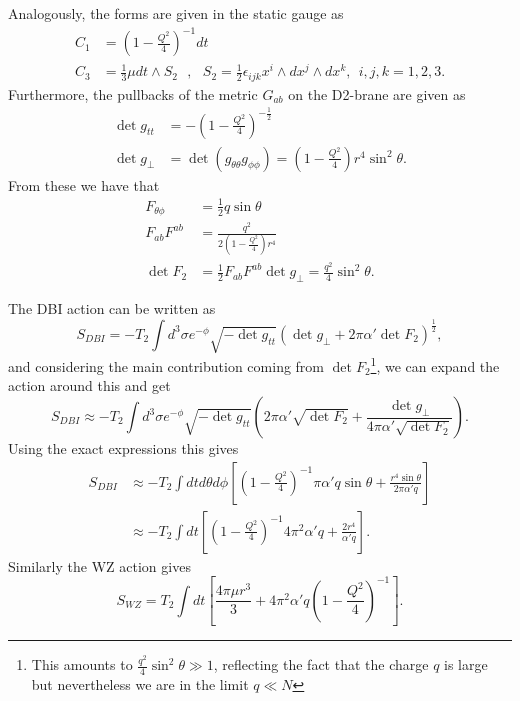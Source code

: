 \documentclass[11pt,english]{article}
\newcommand{\be}{\begin{equation}}
\newcommand{\ee}{\end{equation}}
\def\nn{\nonumber}
\numberwithin{equation}{section}
\begin{document}
\noindent
Analogously, the forms are given in the static gauge as 
\begin{align} 
C_1&=\left(1-\frac{Q^2}{4}\right)^{-1}dt\\
C_3&=\frac{1}{3}\mu dt\wedge S_2~~~,~~~S_2=\frac{1}{2}\epsilon_{ijk}x^i\wedge dx^j\wedge dx^k,~~i,j,k=1,2,3.
\end{align}
Furthermore, the pullbacks of the metric $G_{ab}$ on the D2-brane are given as 
\begin{align}
\det{g_{tt}}&=-\left(1-\frac{Q^2}{4}\right)^{-\frac{1}{2}}\\
\det{g_{\perp}}&=\det({g_{\theta\theta}g_{\phi\phi}})=\left(1-\frac{Q^2}{4}\right)r^4\sin^2\theta.
\end{align}
\noindent
From these we have that 
\begin{align}
F_{\theta\phi}&=\frac{1}{2}q\sin\theta\\
F_{ab}F^{ab}&=\frac{q^2}{2\left(1-\frac{Q^2}{4}\right)r^4}\\
\det{F_2}&=\frac{1}{2}F_{ab}F^{ab}\det{g_{\perp}}=\frac{q^2}{4}\sin^2\theta.
\end{align} 

\noindent
The DBI action can be written as
\be 
S_{DBI}=-T_2\int d^3\sigma e^{-\phi}\sqrt{-\det{g_{tt}}}\left(\det{g_{\perp}+2\pi\alpha'\det{F_2}}\right)^\frac{1}{2},
\ee 
and considering the main contribution coming from $\det{F_2}$\footnote{This amounts to $\frac{q^2}{4}\sin^2\theta\gg 1$, reflecting the fact that the charge $q$ is large but nevertheless we are in the limit $q\ll N$ }, we can expand the action around this and get
\be 
S_{DBI}\approx-T_2\int d^3\sigma e^{-\phi}\sqrt{-\det{g_{tt}}}\left(2\pi\alpha'\sqrt{\det{F_2}}+\frac{\det{g_{\perp}}}{4\pi \alpha'\sqrt{\det{F_2}}}\right).
\ee 
Using the exact expressions this gives 
\begin{align}\nn
S_{DBI}&\approx-T_2\int dt d\theta d\phi\left[\left(1-\frac{Q^2}{4}\right)^{-1}\pi\alpha' q\sin\theta+\frac{r^4\sin\theta}{2\pi\alpha' q}\right]\\
&\approx -T_2\int dt\left[\left(1-\frac{Q^2}{4}\right)^{-1}4\pi^2\alpha' q+\frac{2r^4}{\alpha' q}\right].
\end{align}
Similarly the WZ action gives 
\be 
S_{WZ}=T_2\int dt \left[\frac{4\pi\mu r^3}{3}+4\pi^2\alpha' q\left(1-\frac{Q^2}{4}\right)^{-1}\right].
\ee
\end{document}
